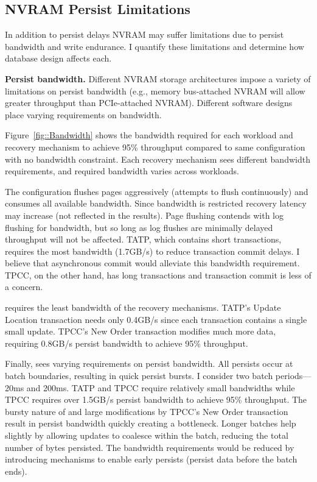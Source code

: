 \subsection{NVRAM Persist Limitations}
\label{sec:OLTP_eval:Persists:Limitations}

In addition to persist delays NVRAM may suffer limitations due to persist bandwidth and write endurance.
I quantify these limitations and determine how database design affects each.

\textbf{Persist bandwidth.}
Different NVRAM storage architectures impose a variety of limitations on persist bandwidth (e.g., memory bus-attached NVRAM will allow greater throughput than PCIe-attached NVRAM).
Different software designs place varying requirements on bandwidth.


Figure~\ref{fig::Bandwidth} shows the bandwidth required for each workload and recovery mechanism to achieve 95\% throughput compared to same configuration with no bandwidth constraint.
Each recovery mechanism sees different bandwidth requirements, and required bandwidth varies across workloads.

The \NVDisk configuration flushes pages aggressively (attempts to flush continuously) and consumes all available bandwidth.
Since bandwidth is restricted recovery latency may increase (not reflected in the results).
Page flushing contends with log flushing for bandwidth, but so long as log flushes are minimally delayed throughput will not be affected.
TATP, which contains short transactions, requires the most bandwidth (1.7GB/s) to reduce transaction commit delays.
I believe that asynchronous commit would alleviate this bandwidth requirement.
TPCC, on the other hand, has long transactions and transaction commit is less of a concern.

\InPlace requires the least bandwidth of the recovery mechanisms.
TATP's Update Location transaction needs only 0.4GB/s since each transaction contains a single small update.
TPCC's New Order transaction modifies much more data, requiring 0.8GB/s persist bandwidth to achieve 95\% throughput.

Finally, \GroupCommit sees varying requirements on persist bandwidth.
All persists occur at batch boundaries, resulting in quick persist bursts.
I consider two batch periods---20ms and 200ms.
TATP and TPCC require relatively small bandwidths while TPCC requires over 1.5GB/s persist bandwidth to achieve 95\% throughput.
The bursty nature of \GroupCommit and large modifications by TPCC's New Order transaction result in persist bandwidth quickly creating a bottleneck.
Longer batches help slightly by allowing updates to coalesce within the batch, reducing the total number of bytes persisted.
The bandwidth requirements would be reduced by introducing mechanisms to enable early persists (persist data before the batch ends).

